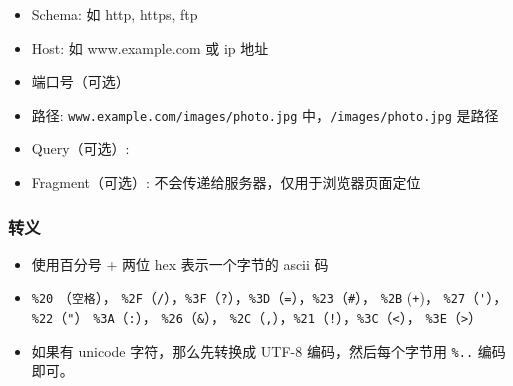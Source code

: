 

\begin{issues}
\issueDraft
\end{issues}

\begin{itemize}
\item Schema: 如 http, https, ftp
\item Host: 如 www.example.com 或 ip 地址
\item 端口号（可选）
\item 路径: \verb`www.example.com/images/photo.jpg` 中，\verb`/images/photo.jpg` 是路径
\item Query（可选）:
\item Fragment（可选）: 不会传递给服务器，仅用于浏览器页面定位
\end{itemize}

\subsubsection{转义}
\begin{itemize}
\item 使用百分号 + 两位 hex 表示一个字节的 ascii 码
\item \verb`%20` （\verb`空格`）， \verb`%2F`（\verb`/`），\verb`%3F`（\verb`?`），\verb`%3D`（\verb`=`），\verb`%23`（\verb`#`）， \verb`%2B` (\verb`+`)， \verb`%27`（\verb`'`），\verb`%22`（\verb`"`） \verb`%3A`（\verb`:`）， \verb`%26`（\verb`&`）， \verb`%2C`（\verb`,`），\verb`%21`（\verb`!`），\verb`%3C`（\verb`<`）， \verb`%3E`（\verb`>`）
\item 如果有 unicode 字符，那么先转换成 UTF-8 编码，然后每个字节用 \verb`%..` 编码即可。
\end{itemize}
